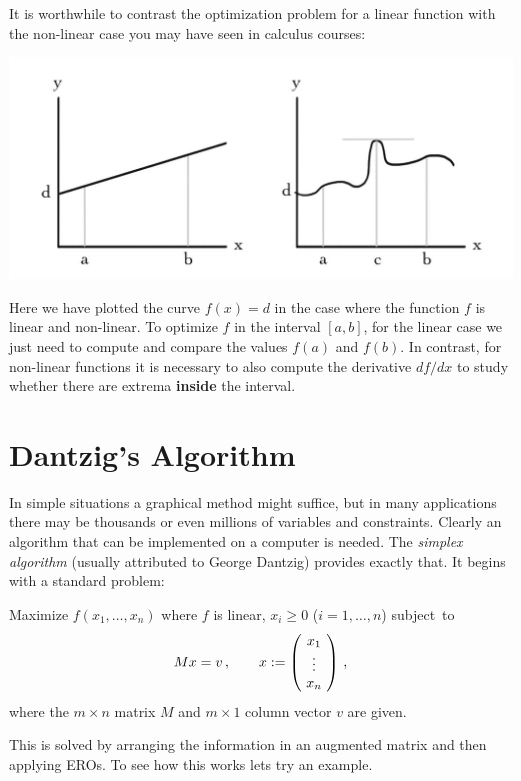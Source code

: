It is worthwhile to contrast the optimization problem for a linear function with the non-linear case you may have seen in calculus courses:
\vspace{-1.5mm}
\begin{center}
\hspace{-1cm}\includegraphics[scale=.33]{simplex/linvsnonlin.jpg}
\end{center}
Here we have plotted the curve $f(x)=d$ in the case where the function $f$ is linear and non-linear. 
To optimize $f$ in the interval $[a,b]$, for the linear case we just need to compute and compare the values $f(a)$ 
and $f(b)$. In contrast, for non-linear functions it is necessary to also compute the derivative $df/dx$ to study whether
there are extrema {\bfseries inside} the interval.

\section{Dantzig's Algorithm}\label{dantzig}

In simple situations a graphical method might suffice, but in many applications there may be thousands or even millions of variables 
and constraints. Clearly an algorithm that can be implemented on a computer is needed. The {\itshape simplex algorithm} (usually attributed to George Dantzig) provides exactly that. It begins with a standard problem:

\begin{problem}
Maximize $f(x_1,\ldots,x_n)$ where $f$ is linear, $x_i\geq 0$ ($i=1,\ldots, n$) subject~to  
\[
Mx = v\, ,\qquad x:=\left(\!\begin{array}{c} x_1\\\vdots \\ x_n \end{array}\!\right)\, ,
\]
where the $m\times n$ matrix $M$ and $m\times 1$ column vector $v$ are given.
\end{problem}
 
This is solved by arranging the information in an augmented matrix and then applying EROs.
To see how this works lets try an example.


